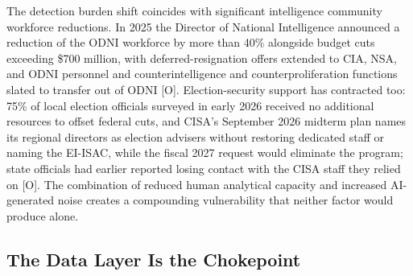\documentclass[11pt,letterpaper]{article}
\begin{document}
\begin{warnbox}
The detection burden shift coincides with significant intelligence community workforce reductions. In 2025 the Director of National Intelligence announced a reduction of the ODNI workforce by more than 40\% alongside budget cuts exceeding \$700 million, with deferred-resignation offers extended to CIA, NSA, and ODNI personnel and counterintelligence and counterproliferation functions slated to transfer out of ODNI [O]. Election-security support has contracted too: 75\% of local election officials surveyed in early 2026 received no additional resources to offset federal cuts, and CISA's September 2026 midterm plan names its regional directors as election advisers without restoring dedicated staff or naming the EI-ISAC, while the fiscal 2027 request would eliminate the program; state officials had earlier reported losing contact with the CISA staff they relied on [O]. The combination of reduced human analytical capacity and increased AI-generated noise creates a compounding vulnerability that neither factor would produce alone.
\end{warnbox}

\subsection{The Data Layer Is the Chokepoint}
\end{document}
